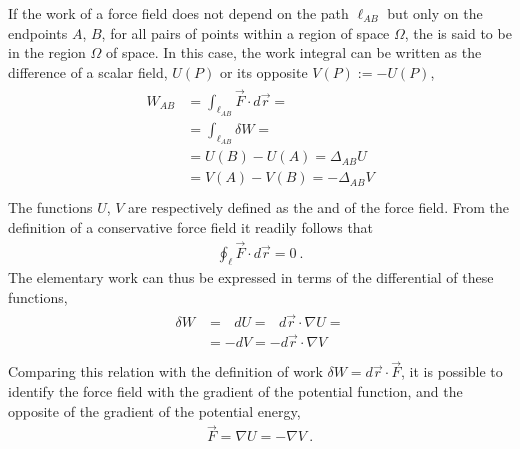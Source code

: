 \documentclass[letterpaper,10pt,english]{jupyterBook}
\begin{document}
\sphinxAtStartPar
If the work of a force field does not depend on the path \(\ell_{AB}\) but only on the endpoints \(A\), \(B\), for all pairs of points within a region of space \(\Omega\), the  is said to be  in the region \(\Omega\) of space. In this case, the work integral can be written as the difference of a scalar field, \(U(P)\) or its opposite \(V(P) := - U(P)\),
\begin{equation*}
\begin{split}\begin{aligned}
  W_{AB} &  = \int_{\ell_{AB}} \vec{F} \cdot d \vec{r} = \\
         &  = \int_{\ell_{AB}} \delta W = \\
         &  = U(B) - U(A) = \Delta_{AB} U  \\
         &  = V(A) - V(B) = -\Delta_{AB} V  \\
\end{aligned}\end{split}
\end{equation*}
\sphinxAtStartPar
The functions \(U\), \(V\) are respectively defined as the  and  of the force field. From the definition of a conservative force field it readily follows that
\begin{equation*}
\begin{split}\oint_{\ell} \vec{F} \cdot d \vec{r} = 0 \ .\end{split}
\end{equation*}
\sphinxAtStartPar
The elementary work can thus be expressed in terms of the differential of these functions,
\begin{equation*}
\begin{split}\begin{aligned}
  \delta W & = \ \ \ d U =\ \ \ d \vec{r} \cdot \nabla U  = \\
           & =     - d V =    - d \vec{r} \cdot \nabla V \\
\end{aligned}\end{split}
\end{equation*}
\sphinxAtStartPar
Comparing this relation with the definition of work \(\delta W = d \vec{r} \cdot \vec{F}\), it is possible to identify the force field with the gradient of the potential function, and the opposite of the gradient of the potential energy,
\begin{equation*}
\begin{split}\vec{F} = \nabla U = - \nabla V \ .\end{split}
\end{equation*}
\end{document}
